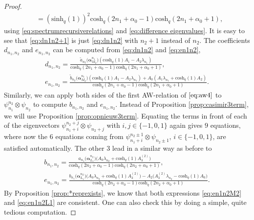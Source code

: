 \documentclass[10pt,a4paper]{amsart}
\numberwithin{equation}{section}
\newcommand{\chq}{\mathrm{cosh}_q}
\newcommand{\shq}{\mathrm{sinh}_q}
\begin{document}
\begin{proof}
\begin{align*}
& = (\shq(1))^2\chq(2n_1+\alpha_0-1)\chq(2n_1+\alpha_0+1),
	\end{align*}
	using \eqref{eq:spectrumrecursiverelations} and \eqref{eq:difference eigenvalues}. It is easy to see that \eqref{eq:dn1n2+1} is just \eqref{eq:dn1n2} with $n_2+1$ instead of $n_2$. The coefficients $d_{n_1,n_2}$ and $e_{n_1,n_2}$ can be computed from \eqref{eq:dn1n2} and \eqref{eq:en1n2},
	\begin{gather}
		d_{n_1,n_2} = \frac{\tilde{a}_{n_2}\big(\bm{\alpha}_{M_2}^{n_1}\big) (\chq(1)A_1-A_2\lambda_{n_1})}{\chq(2n_1+\alpha_0-1)\chq(2n_1+\alpha_0+1)},\nonumber\\
		e_{n_1,n_2} = \frac{\tilde{b}_{n_2}\big(\bm{\alpha}_{M_2}^{n_1}\big) (\chq(1)A_1-A_2\lambda_{n_1} )+A_0 (A_1\lambda_{n_1}+\chq(1)A_2 )}{\chq(2n_1+\alpha_0-1)\chq(2n_1+\alpha_0+1)}.\label{eq:en1n2M2}
	\end{gather}
	Similarly, we can apply both sides of the first AW-relation of $\eqref{eq:aw4}$ to $\psi_{n_1}^{n_2}\otimes \psi_{n_2}$ to compute $b_{n_1,n_2}$ and $e_{n_1,n_2}$. Instead of Proposition \ref{prop:casimir3term}, we will use Proposition \ref{prop:opnieuw3term}. Equating the terms in front of each of the eigenvectors $\psi_{n_1+i}^{n_2+j}\otimes \psi_{n_2+j}$ with $i,j\in\{-1,0,1\}$ again gives $9$ equations, where now the $6$ equations coming from $\psi_{n_1+ i}^{n_2\pm 1}\otimes \psi_{n_2\pm 1}$, $i\in\{-1,0,1\}$, are satisfied automatically. The other 3 lead in a similar way as before to
	\begin{gather}
		b_{n_1,n_2} = \frac{a_{n_1}\big(\bm{\alpha}_{L_1}^{n_2}\big)\big(A_0\lambda_{n_2} +\chq(1)A_3^{(2)}\big)}{\chq(2n_2+\alpha_0-1)\chq(2n_2+\alpha_0+1)},\nonumber\\
		e_{n_1,n_2} = \frac{b_{n_1}\big(\bm{\alpha}_{L_1}^{n_2}\big)\big(A_0\lambda_{n_2} +\chq(1)A_3^{(2)}\big)-A_2\big(A_3^{(2)}\lambda_{n_2}-\chq(1)A_0\big)}{\chq(2n_2+\alpha_0-1)\chq(2n_2+\alpha_0+1)}.\label{eq:en1n2L1}
	\end{gather}
By Proposition \ref{prop:*reprexists}, we know that both expressions \eqref{eq:en1n2M2} and \eqref{eq:en1n2L1} are consistent. One can also check this by doing a simple, quite tedious computation.
	

\end{proof}
\end{document}
